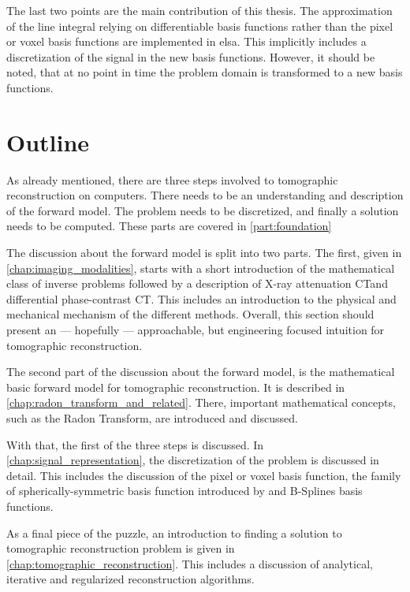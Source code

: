 The last two points are the main contribution of this thesis. The approximation of the line integral
relying on differentiable basis functions rather than the pixel or voxel basis functions are
implemented in elsa. This implicitly includes a discretization of the signal in the new basis
functions. However, it should be noted, that at no point in time the problem domain is transformed
to a new basis functions.

\section{Outline}\label{sec:outline}

As already mentioned, there are three steps involved to tomographic reconstruction on computers.
There needs to be an understanding and description of the forward model. The problem needs to be
discretized, and finally a solution needs to be computed. These parts are covered in
\autoref{part:foundation}

The discussion about the forward model is split into two parts. The first, given in
\autoref{chap:imaging_modalities}, starts with a short introduction of the mathematical class of
inverse problems followed by a description of X-ray attenuation CT\@ and differential phase-contrast
CT\@. This includes an introduction to the physical and mechanical mechanism of the different
methods. Overall, this section should present an --- hopefully --- approachable, but engineering
focused intuition for tomographic reconstruction.

The second part of the discussion about the forward model, is the mathematical basic forward model
for tomographic reconstruction. It is described in \autoref{chap:radon_transform_and_related}. There,
important mathematical concepts, such as the Radon Transform, are introduced and discussed.

With that, the first of the three steps is discussed. In \autoref{chap:signal_representation}, the
discretization of the problem is discussed in detail. This includes the discussion of the pixel or
voxel basis function, the family of spherically-symmetric basis function introduced by
\citeauthor*{lewitt_multidimensional_1990} and B-Splines basis functions.

As a final piece of the puzzle, an introduction to finding a solution to tomographic reconstruction
problem is given in \autoref{chap:tomographic_reconstruction}. This includes a discussion of
analytical, iterative and regularized reconstruction algorithms.

